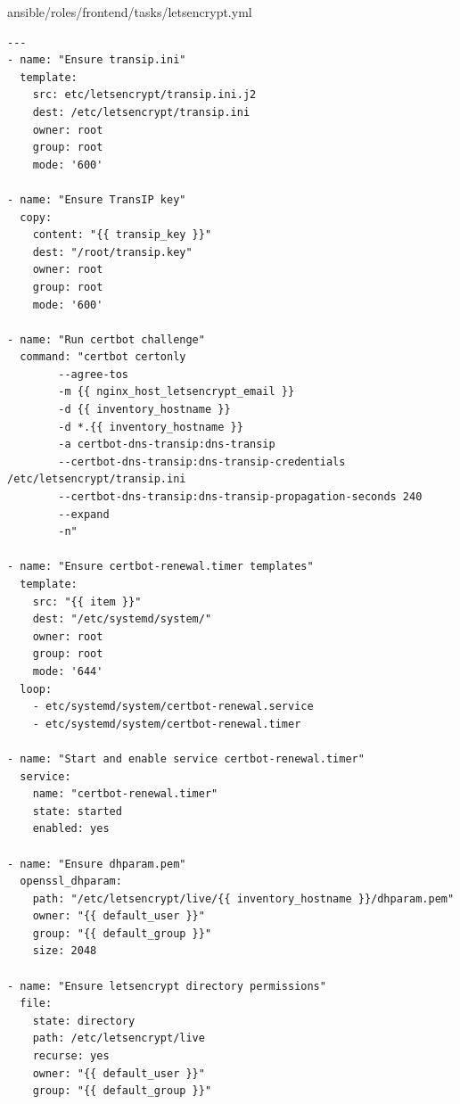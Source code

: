 ansible/roles/frontend/tasks/letsencrypt.yml
\begin{verbatim}
---
- name: "Ensure transip.ini"
  template:
    src: etc/letsencrypt/transip.ini.j2
    dest: /etc/letsencrypt/transip.ini
    owner: root
    group: root
    mode: '600'

- name: "Ensure TransIP key"
  copy:
    content: "{{ transip_key }}"
    dest: "/root/transip.key"
    owner: root
    group: root
    mode: '600'

- name: "Run certbot challenge"
  command: "certbot certonly
        --agree-tos
        -m {{ nginx_host_letsencrypt_email }}
        -d {{ inventory_hostname }}
        -d *.{{ inventory_hostname }}
        -a certbot-dns-transip:dns-transip
        --certbot-dns-transip:dns-transip-credentials /etc/letsencrypt/transip.ini
        --certbot-dns-transip:dns-transip-propagation-seconds 240
        --expand
        -n"

- name: "Ensure certbot-renewal.timer templates"
  template:
    src: "{{ item }}"
    dest: "/etc/systemd/system/"
    owner: root
    group: root
    mode: '644'
  loop:
    - etc/systemd/system/certbot-renewal.service
    - etc/systemd/system/certbot-renewal.timer

- name: "Start and enable service certbot-renewal.timer"
  service:
    name: "certbot-renewal.timer"
    state: started
    enabled: yes

- name: "Ensure dhparam.pem"
  openssl_dhparam:
    path: "/etc/letsencrypt/live/{{ inventory_hostname }}/dhparam.pem"
    owner: "{{ default_user }}"
    group: "{{ default_group }}"
    size: 2048

- name: "Ensure letsencrypt directory permissions"
  file:
    state: directory
    path: /etc/letsencrypt/live
    recurse: yes
    owner: "{{ default_user }}"
    group: "{{ default_group }}"
\end{verbatim}

